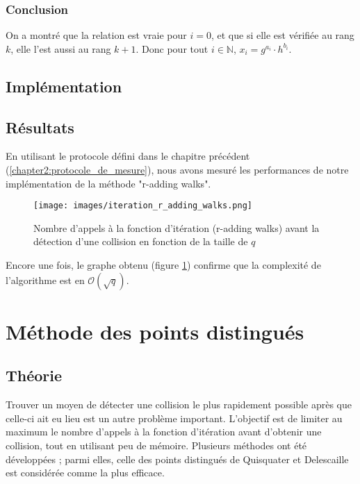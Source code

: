         \subsubsection*{Conclusion}
        On a montré que la relation est vraie pour $i = 0$, et que si elle est vérifiée au rang $k$, elle l'est aussi au rang $k + 1$. Donc pour tout $i \in \mathbb{N}$, $x_i = g^{a_i} \cdot h^{b_i}$.

      \subsection{Implémentation}
      \subsection{Résultats}
      En utilisant le protocole défini dans le chapitre précédent (\ref{chapter2:protocole_de_mesure}), nous avons mesuré les performances de notre implémentation de la méthode "r-adding walks".

      \begin{figure}
        \center{}
        \texttt{[image: images/iteration\_r\_adding\_walks.png]}
        \caption{Nombre d'appels à la fonction d'itération (r-adding walks) avant la détection d'une collision en fonction de la taille de $q$}
        \label{fig:r_adding_walks_iteration_results}
      \end{figure}

      Encore une fois, le graphe obtenu (figure \ref{fig:r_adding_walks_iteration_results}) confirme que la complexité de l'algorithme est en $\mathcal{O}(\sqrt{q})$.


    \section{Méthode des points distingués}
      \subsection{Théorie}
      Trouver un moyen de détecter une collision le plus rapidement possible après que celle-ci ait eu lieu est un autre problème important.  L'objectif est de limiter au maximum le nombre d'appels à la fonction d'itération avant d'obtenir une collision, tout en utilisant peu de mémoire. Plusieurs méthodes ont été développées ; parmi elles, celle des points distingués de Quisquater et Delescaille~\autocite[4]{pollard1} est considérée comme la plus efficace.

